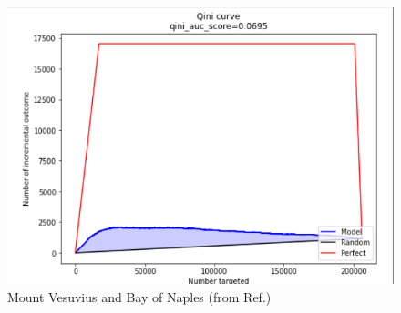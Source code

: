 \begin{figure}[h!]
\centering
\includegraphics[width=5in]
{uplift/qini.png}
\caption{Mount Vesuvius and Bay of Naples 
(from Ref.\cite{scikit-uplift})}
\label{fig-qini}
\end{figure}



